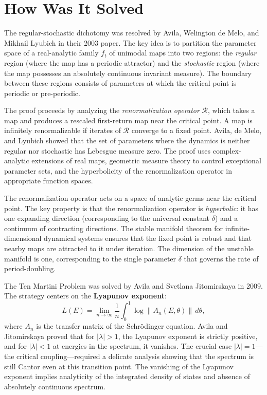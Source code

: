 \section{How Was It Solved}

The regular-stochastic dichotomy was resolved by Avila, Welington de Melo, and Mikhail Lyubich in their 2003 paper. The key idea is to partition the parameter space of a real-analytic family $f_t$ of unimodal maps into two regions: the \emph{regular} region (where the map has a periodic attractor) and the \emph{stochastic} region (where the map possesses an absolutely continuous invariant measure). The boundary between these regions consists of parameters at which the critical point is periodic or pre-periodic.

The proof proceeds by analyzing the \emph{renormalization operator} $\mathcal{R}$, which takes a map and produces a rescaled first-return map near the critical point. A map is infinitely renormalizable if iterates of $\mathcal{R}$ converge to a fixed point. Avila, de Melo, and Lyubich showed that the set of parameters where the dynamics is neither regular nor stochastic has Lebesgue measure zero. The proof uses complex-analytic extensions of real maps, geometric measure theory to control exceptional parameter sets, and the hyperbolicity of the renormalization operator in appropriate function spaces.

The renormalization operator acts on a space of analytic germs near the critical point. The key property is that the renormalization operator is \emph{hyperbolic}: it has one expanding direction (corresponding to the universal constant $\delta$) and a continuum of contracting directions. The stable manifold theorem for infinite-dimensional dynamical systems ensures that the fixed point is robust and that nearby maps are attracted to it under iteration. The dimension of the unstable manifold is one, corresponding to the single parameter $\delta$ that governs the rate of period-doubling.

The Ten Martini Problem was solved by Avila and Svetlana Jitomirskaya in 2009. The strategy centers on the \textbf{Lyapunov exponent}:
\[
L(E) = \lim_{n\to\infty}\frac{1}{n}\int_0^1\log\|A_n(E,\theta)\|\,d\theta,
\]
where $A_n$ is the transfer matrix of the Schr\"{o}dinger equation. Avila and Jitomirskaya proved that for $|\lambda|>1$, the Lyapunov exponent is strictly positive, and for $|\lambda|<1$ at energies in the spectrum, it vanishes. The crucial case $|\lambda|=1$---the critical coupling---required a delicate analysis showing that the spectrum is still Cantor even at this transition point. The vanishing of the Lyapunov exponent implies analyticity of the integrated density of states and absence of absolutely continuous spectrum.

